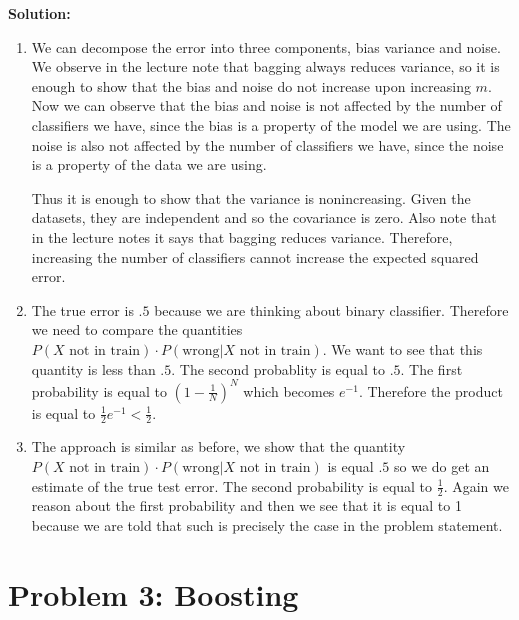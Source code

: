 \documentclass[11pt]{article}
\begin{document}
\textbf{Solution:}
\begin{enumerate}
    \item We can decompose the error into three components, bias variance and noise. We observe in the lecture note that bagging always reduces variance, so it is enough to show that the bias and noise do not
    increase upon increasing $m$. Now we can observe that the bias and noise is not affected by the number of classifiers we have, since the bias is a property of the model we are using.
     The noise is also not affected by the number of classifiers we have, since the noise is a property of the data we are using. 

    Thus it is enough to show that the variance is nonincreasing. Given the datasets, they are independent and so the covariance is zero.
    Also note that in the lecture notes it says that bagging reduces variance. Therefore, increasing the number of classifiers cannot increase the expected squared error.
    \item The true error is $.5$ because we are thinking about binary classifier. Therefore we need to compare
    the quantities
        $P(\text{$X$ not in train}) \cdot P(\text{wrong} \vert \text{$X$ not in train})$. We want to see that this quantity
        is less than $.5$. The second probablity is equal to $.5$. The first probability is equal to $(1-\frac{1}{N})^N$ which becomes $e^{-1}$.
        Therefore the product is equal to $\frac{1}{2}e^{-1} < \frac{1}{2}$.
    \item The approach is similar as before, we show that the quantity $P(\text{$X$ not in train}) \cdot P(\text{wrong} \vert \text{$X$ not in train})$
    is equal $.5$ so we do get an estimate of the true test error. The second probability is equal to $\frac{1}{2}$. Again we reason about the 
    first probability and then we see that it is equal to 1 because we are told that such is precisely the case in 
    the problem statement. 
\end{enumerate}


\section*{Problem 3: Boosting}
\end{document}
